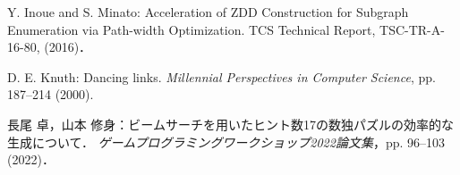 \documentclass[a4paper, 9pt]{jarticle}
\begin{document}
\begin{論文概要}
\begin{thebibliography}{10}
  Y. Inoue and S. Minato: Acceleration of ZDD Construction for Subgraph 
  Enumeration via Path-width Optimization. TCS Technical Report, 
  TSC-TR-A-16-80, (2016)．

  D. E. Knuth: Dancing links. 
  {\it Millennial Perspectives in Computer Science}, pp. 187--214 (2000).
  
  長尾 卓，山本 修身：ビームサーチを用いたヒント数17の数独パズルの効率的な生成について．
  {\it ゲームプログラミングワークショップ2022論文集}，pp. 96--103 (2022)．

\end{thebibliography}

\end{論文概要} %
\end{document}
